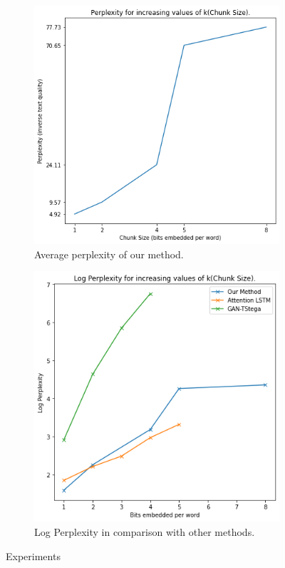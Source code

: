 \documentclass[journal,onecolumn]{IEEEtran}
\begin{document}
\begin{figure}
  \centering
  \begin{subfigure}[b]{0.432\textwidth}
      \centering
      \includegraphics[width=\textwidth]{figures/perp_solo.png}
      \caption{Average perplexity of our method.}
      \label{fig:solo_perp}
  \end{subfigure}
  \hfill
  \begin{subfigure}[b]{0.432\textwidth}
      \centering
      \includegraphics[width=\textwidth]{figures/perp_compare.png}
      \caption{Log Perplexity in comparison with other methods.}
      \label{fig:comp_perp}
  \end{subfigure}
     \caption{Experiments}
     \label{fig:method}
\end{figure}
\end{document}
